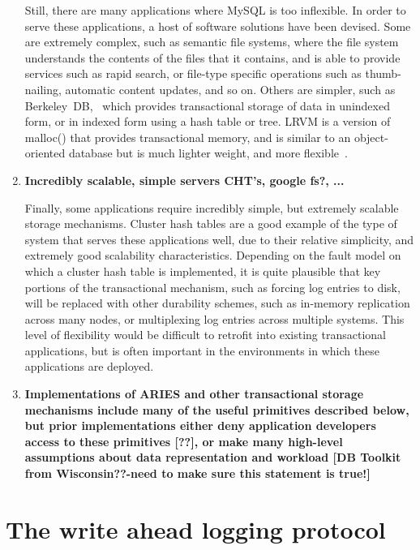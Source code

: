 \documentclass[letterpaper,english]{article}
\begin{document}
\begin{enumerate}
Still, there are many applications where MySQL is too inflexible.  In
order to serve these applications, a host of software solutions have
been devised.  Some are extremely complex, such as semantic file
systems, where the file system understands the contents of the files
that it contains, and is able to provide services such as rapid
search, or file-type specific operations such as thumb-nailing,
automatic content updates, and so on.  Others are simpler, such as
Berkeley~DB,~\cite{berkeleyDB, bdb} which provides transactional
storage of data in unindexed form, or in indexed form using a hash
table or tree.  LRVM is a version of malloc() that provides
transactional memory, and is similar to an object-oriented database
but is much lighter weight, and more flexible~\cite{lrvm}.

  \item {\bf Incredibly scalable, simple servers CHT's, google fs?, ...}

Finally, some applications require incredibly simple, but extremely
scalable storage mechanisms.  Cluster hash tables are a good example
of the type of system that serves these applications well, due to
their relative simplicity, and extremely good scalability
characteristics.  Depending on the fault model on which a cluster hash
table is implemented, it is quite plausible that key portions of the
transactional mechanism, such as forcing log entries to disk, will be
replaced with other durability schemes, such as in-memory replication
across many nodes, or multiplexing log entries across multiple
systems.  This level of flexibility would be difficult to retrofit
into existing transactional applications, but is often important in
the environments in which these applications are deployed.


  \item {\bf Implementations of ARIES and other transactional storage
  mechanisms include many of the useful primitives described below,
  but prior implementations either deny application developers access
  to these primitives {[}??{]}, or make many high-level assumptions
  about data representation and workload {[}DB Toolkit from
  Wisconsin??-need to make sure this statement is true!{]}}

\end{enumerate}


\section{The write ahead logging protocol}
\end{document}
